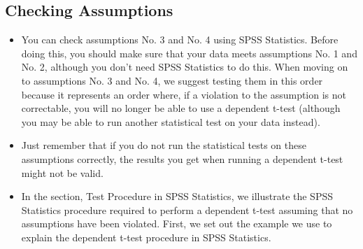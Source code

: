\documentclass[]{article}
\begin{document}
\subsection*{Checking Assumptions}	
\begin{itemize}
	\item You can check assumptions No. 3 and No. 4 using SPSS Statistics. Before doing this, you should make sure that your data meets assumptions No. 1 and No. 2, although you don't need SPSS Statistics to do this. When moving on to assumptions No. 3 and No. 4, we suggest testing them in this order because it represents an order where, if a violation to the assumption is not correctable, you will no longer be able to use a dependent t-test (although you may be able to run another statistical test on your data instead). 
	
	\item Just remember that if you do not run the statistical tests on these assumptions correctly, the results you get when running a dependent t-test might not be valid. 
	
	\item In the section, Test Procedure in SPSS Statistics, we illustrate the SPSS Statistics procedure required to perform a dependent t-test assuming that no assumptions have been violated. First, we set out the example we use to explain the dependent t-test procedure in SPSS Statistics.
\end{itemize}


\end{document}
